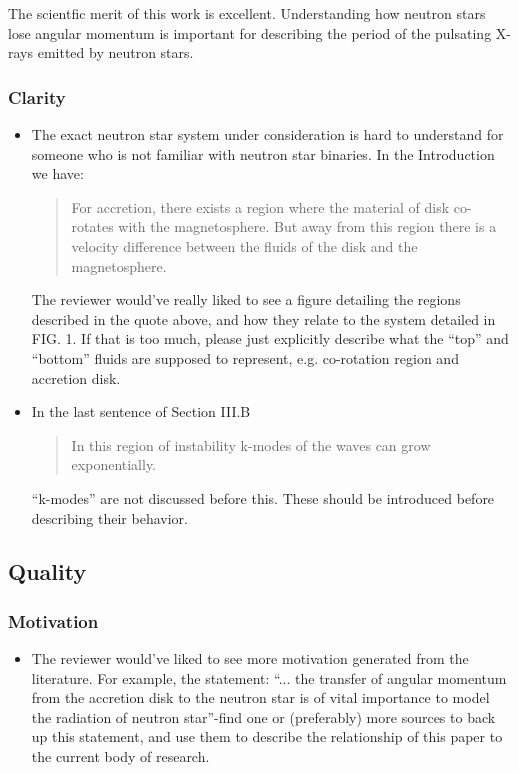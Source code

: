 \documentclass[10pt,letterpaper]{article}
\begin{document}
				The scientfic merit of this work is excellent. 
				Understanding how neutron stars lose angular momentum is important for describing the period of the pulsating X-rays emitted by neutron stars.
			
			\subsubsection{Clarity}
			
				\begin{itemize}
					\item The exact neutron star system under consideration is hard to understand for someone who is not familiar with neutron star binaries. In the Introduction we have:
					\begin{quote}
						For accretion, there exists a region where the material of disk co-rotates with the magnetosphere. But away from this region there is a velocity difference between the fluids of the disk and the magnetosphere.
					\end{quote}
					The reviewer would've really liked to see a figure detailing the regions described in the quote above, and how they relate to the system detailed in FIG. 1.
					If that is too much, please just explicitly describe what the ``top'' and ``bottom'' fluids are supposed to represent, e.g. co-rotation region and accretion disk.
					
					\item In the last sentence of Section III.B
					\begin{quote}
						In this region of instability k-modes of the waves can grow exponentially.
					\end{quote}
					``k-modes'' are not discussed before this. These should be introduced before describing their behavior. 
				\end{itemize}
			
		\subsection{Quality}
			\subsubsection{Motivation}
			
				\begin{itemize}
					\item The reviewer would've liked to see more motivation generated from the literature.
					For example, the statement: ``... the transfer of angular momentum from the accretion disk to the neutron star is of vital importance to model the radiation of neutron star''-find one or (preferably) more sources to back up this statement, and use them to describe the relationship of this paper to the current body of research.
					
				\end{itemize}
			
\end{document}
